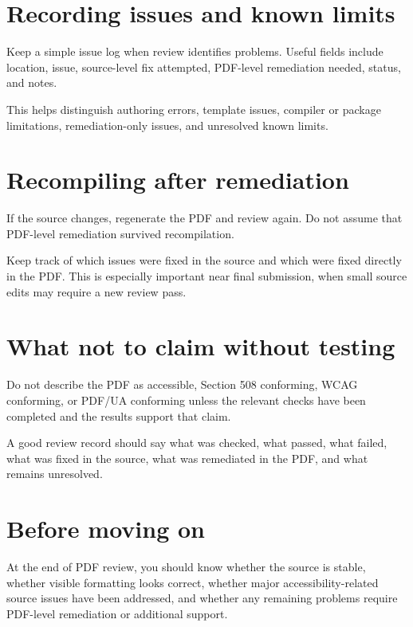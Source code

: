 \section{Recording issues and known limits}
\label{sec:recording-issues-known-limits}

Keep a simple issue log when review identifies problems. Useful fields include location, issue, source-level fix attempted, PDF-level remediation needed, status, and notes.

This helps distinguish authoring errors, template issues, compiler or package limitations, remediation-only issues, and unresolved known limits.

\section{Recompiling after remediation}
\label{sec:recompiling-after-remediation}

If the source changes, regenerate the PDF and review again. Do not assume that PDF-level remediation survived recompilation.

Keep track of which issues were fixed in the source and which were fixed directly in the PDF. This is especially important near final submission, when small source edits may require a new review pass.

\section{What not to claim without testing}
\label{sec:what-not-to-claim}

Do not describe the PDF as accessible, Section 508 conforming, WCAG conforming, or PDF/UA conforming unless the relevant checks have been completed and the results support that claim.

A good review record should say what was checked, what passed, what failed, what was fixed in the source, what was remediated in the PDF, and what remains unresolved.

\section{Before moving on}
\label{sec:before-moving-on-pdf-review}

At the end of PDF review, you should know whether the source is stable, whether visible formatting looks correct, whether major accessibility-related source issues have been addressed, and whether any remaining problems require PDF-level remediation or additional support.
